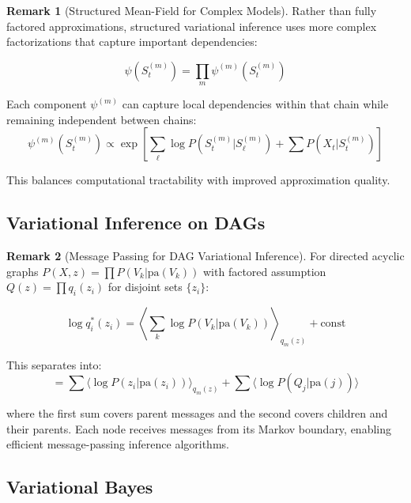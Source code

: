 \documentclass[12pt,a4paper]{article}
\theoremstyle{definition}
\newtheorem{remark}{Remark}[section]
\begin{document}
\begin{remark}[Structured Mean-Field for Complex Models]
Rather than fully factored approximations, structured variational inference uses more complex factorizations that capture important dependencies:

\[
\psi(S_t^{(m)}) = \prod_m \psi^{(m)}(S_t^{(m)})
\]

Each component $\psi^{(m)}$ can capture local dependencies within that chain while remaining independent between chains:
\[
\psi^{(m)}(S_t^{(m)}) \propto \exp \left[ \sum_\ell \log P(S_t^{(m)} | S_{\ell}^{(m)}) + \sum P(X_t | S_t^{(m)}) \right]
\]

This balances computational tractability with improved approximation quality.
\end{remark}

\subsection{Variational Inference on DAGs}

\begin{remark}[Message Passing for DAG Variational Inference]
For directed acyclic graphs $P(X, z) = \prod P(V_k | \text{pa}(V_k))$ with factored assumption $Q(z) = \prod q_i(z_i)$ for disjoint sets $\{z_i\}$:

\[
\log q_i^*(z_i) = \left\langle \sum_k \log P(V_k | \text{pa}(V_k)) \right\rangle_{q_m(z)} + \text{const}
\]

This separates into:
\[
= \sum \langle \log P(z_i | \text{pa}(z_i)) \rangle_{q_m(z)} + \sum \langle \log P(Q_j | \text{pa}(j)) \rangle
\]

where the first sum covers parent messages and the second covers children and their parents. Each node receives messages from its Markov boundary, enabling efficient message-passing inference algorithms.
\end{remark}

\subsection{Variational Bayes}
\end{document}
